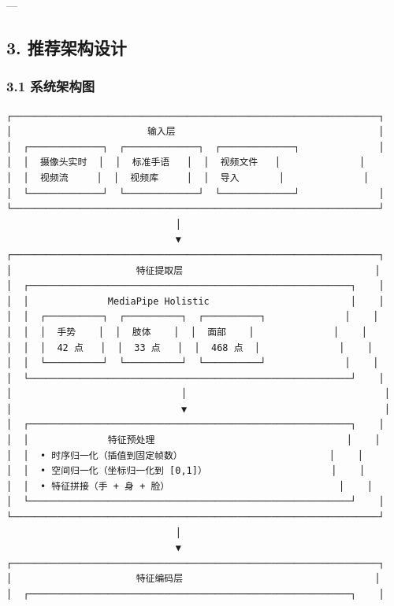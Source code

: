 \documentclass[a4paper,12pt]{article}
\begin{document}
---

\subsection{3. 推荐架构设计}

\subsubsection{3.1 系统架构图}

\begin{verbatim}
┌─────────────────────────────────────────────────────────────────┐
│                        输入层                                    │
│  ┌─────────────┐  ┌─────────────┐  ┌─────────────┐              │
│  │  摄像头实时  │  │  标准手语   │  │  视频文件   │              │
│  │  视频流     │  │  视频库     │  │  导入       │              │
│  └─────────────┘  └─────────────┘  └─────────────┘              │
└─────────────────────────────────────────────────────────────────┘
                              │
                              ▼
┌─────────────────────────────────────────────────────────────────┐
│                      特征提取层                                  │
│  ┌─────────────────────────────────────────────────────────┐    │
│  │              MediaPipe Holistic                         │    │
│  │  ┌──────────┐  ┌──────────┐  ┌──────────┐              │    │
│  │  │  手势    │  │  肢体    │  │  面部    │              │    │
│  │  │  42 点   │  │  33 点   │  │  468 点  │              │    │
│  │  └──────────┘  └──────────┘  └──────────┘              │    │
│  └─────────────────────────────────────────────────────────┘    │
│                              │                                   │
│                              ▼                                   │
│  ┌─────────────────────────────────────────────────────────┐    │
│  │              特征预处理                                  │    │
│  │  • 时序归一化（插值到固定帧数）                          │    │
│  │  • 空间归一化（坐标归一化到 [0,1]）                      │    │
│  │  • 特征拼接（手 + 身 + 脸）                              │    │
│  └─────────────────────────────────────────────────────────┘    │
└─────────────────────────────────────────────────────────────────┘
                              │
                              ▼
┌─────────────────────────────────────────────────────────────────┐
│                      特征编码层                                  │
│  ┌─────────────────────────────────────────────────────────┐    │

\end{verbatim}
\end{document}

